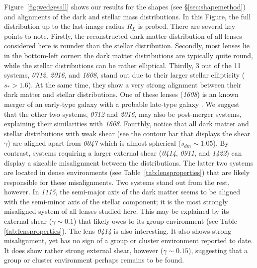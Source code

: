 \documentclass[useAMS,usenatbib]{mn2e}
\begin{document}
Figure~\ref{fig:wedgesall} shows our results for the shapes (see \S\ref{sec:shapemethod}) and alignments of the dark and stellar mass distributions. In this Figure, the full distribution up to the last-image radius $R_{L}$ is probed. There are several key points to note. Firstly, the reconstructed dark matter distribution of all lenses considered here is rounder than the stellar distribution. Secondly, most lenses lie in the bottom-left corner: the dark matter distributions are typically quite round, while the stellar distributions can be rather elliptical. Thirdly, 3 out of the 11 systems, {\it0712}, {\it2016}, and {\it1608}, stand out due to their larger stellar ellipticity ($s_* > 1.6$). At the same time, they show a very strong alignment between their dark matter and stellar distributions. One of these lenses ({\it1608}) is an known merger of an early-type galaxy with a probable late-type galaxy \citep{2003ApJ...584..100S}. We suggest that the other two systems, {\it0712} and {\it2016}, may also be post-merger systems, explaining their similarities with {\it1608}. Fourthly, notice that all dark matter and stellar distributions with weak shear (see the contour bar that displays the shear $\gamma$) are aligned apart from {\it0047} which is almost spherical ($s_{dm}\sim1.05$). By contrast, systems requiring a larger external shear ({\it0414}, {\it0911}, and {\it1422}) can display a sizeable misalignment between the distributions. The latter two systems are located in dense environments (see Table~\ref{tab:lensproperties}) that are likely responsible for these misalignments. Two systems stand out from the rest, however. In {\it1115}, the semi-major axis of the dark matter seems to be aligned with the semi-minor axis of the stellar component; it is the most strongly misaligned system of all lenses studied here. This may be explained by its external shear ($\gamma \sim 0.1$) that likely owes to its group environment (see Table \ref{tab:lensproperties}). The lens {\it0414} is also interesting. It also shows strong misalignment, yet has no sign of a group or cluster environment reported to date. It does show rather strong external shear, however ($\gamma \sim 0.15$), suggesting that a group or cluster environment perhaps remains to be found.
\end{document}
